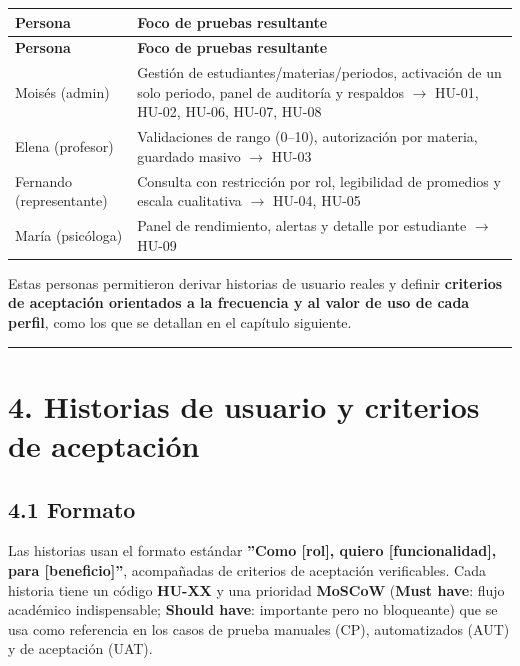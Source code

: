 \documentclass[11pt,a4paper]{article}
\begin{document}
{\small
\begin{longtable}{|p{}|p{}|}
\rowcolor{UTECblue}\color{white}\bfseries Persona & \color{white}\bfseries Foco de pruebas resultante \\ \hline
\endfirsthead
\rowcolor{UTECblue}\color{white}\bfseries Persona & \color{white}\bfseries Foco de pruebas resultante \\ \hline
\endhead
Moisés (admin) & Gestión de estudiantes/materias/periodos, activación de un solo periodo, panel de auditoría y respaldos {$\rightarrow$} HU-01, HU-02, HU-06, HU-07, HU-08 \\ \hline
Elena (profesor) & Validaciones de rango (0--10), autorización por materia, guardado masivo {$\rightarrow$} HU-03 \\ \hline
Fernando (representante) & Consulta con restricción por rol, legibilidad de promedios y escala cualitativa {$\rightarrow$} HU-04, HU-05 \\ \hline
María (psicóloga) & Panel de rendimiento, alertas y detalle por estudiante {$\rightarrow$} HU-09 \\ \hline
\end{longtable}}


Estas personas permitieron derivar historias de usuario reales y definir \textbf{criterios de aceptación orientados a la frecuencia y al valor de uso de cada perfil}, como los que se detallan en el capítulo siguiente.


\hrule\vspace{0.4em}


\section*{4. Historias de usuario y criterios de aceptación}


\subsection*{4.1 Formato}


Las historias usan el formato estándar \textbf{''Como [rol], quiero [funcionalidad], para [beneficio]''}, acompañadas de criterios de aceptación verificables. Cada historia tiene un código \textbf{HU-XX} y una prioridad \textbf{MoSCoW} (\textbf{Must have}: flujo académico indispensable; \textbf{Should have}: importante pero no bloqueante) que se usa como referencia en los casos de prueba manuales (CP), automatizados (AUT) y de aceptación (UAT).
\end{document}
